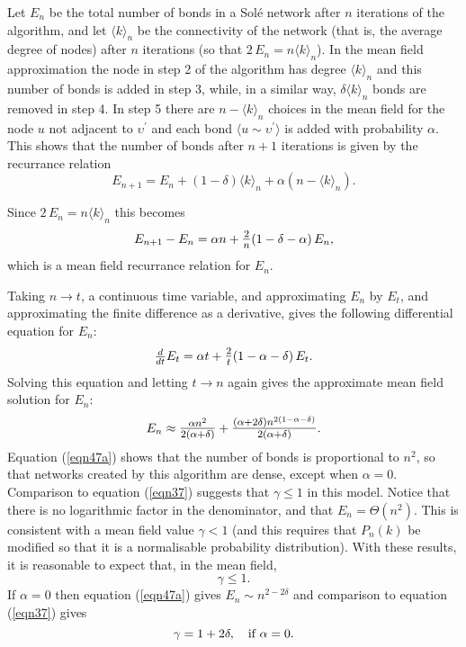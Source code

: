 \documentclass[12pt]{iopart}
\def\edge#1#2{{\langle #1{\sim}#2 \rangle}}
\def\sfrac#1#2{\hbox{\normalsize $\frac{#1}{#2}$}}
\def\Sfrac#1#2{\hbox{\large$\frac{#1}{#2}$}}
\def\Ref#1{(\ref{#1})}
\begin{document}
Let $E_n$ be the total number of bonds in a Sol\'e network after $n$ iterations 
of the algorithm, and let $\langle k \rangle_n$ be the connectivity of the network
(that is, the average degree of nodes) after $n$ iterations (so that 
$2\,E_n = n\langle k \rangle_n$).  In the mean field approximation  the node 
in step 2 of the algorithm has degree $\langle k \rangle_n$ and this number 
of bonds is added in step 3,  while, in a similar way, $\delta \langle k \rangle_n$ 
bonds are removed in step 4.  In step 5 there are $n-\langle k \rangle_n$ choices 
in the mean field for the node $u$ not adjacent to $\upsilon^\prime$ and 
each bond $\edge{u}{\upsilon^\prime}$ is added with probability $\alpha$.  
This shows that the number of bonds after $n+1$ iterations is given by
the recurrance relation
\begin{equation}
E_{n+1} = E_n + (1-\delta) \langle k \rangle_n + \alpha(n - \langle k \rangle_n) .
\end{equation}

Since $2\,E_n = n\langle k \rangle_n$ this becomes
\begin{equation}
E_{n+1} - E_n = \alpha n + \Sfrac{2}{n} (1-\delta-\alpha)\, E_n ,
\end{equation}
which is a mean field recurrance relation for $E_n$.

Taking $n\to t$, a continuous time variable, and approximating $E_n$ by $E_t$,
and approximating the finite difference as a derivative, gives the following
differential equation for $E_n$:
\begin{equation}
\sfrac{d}{dt} E_t = \alpha t + \Sfrac{2}{t}(1-\alpha-\delta)\, E_t .
\end{equation}
Solving this equation and letting $t\to n$ again gives the approximate mean
field solution for $E_n$:
\begin{equation}
E_n \approx \Sfrac{\alpha n^2}{2(\alpha+\delta)} 
+ \Sfrac{(\alpha+2\delta)n^{2(1-\alpha-\delta)}}{2(\alpha+\delta)} .
\label{eqn47a}  %
\end{equation}
Equation \Ref{eqn47a} shows that the number of bonds is proportional to 
$n^2$, so that networks created by this algorithm are dense, except when
$\alpha=0$. Comparison to equation \Ref{eqn37} suggests that $\gamma\leq 1$ in this model.
Notice that there is no logarithmic factor in the denominator, and that
$E_n = \Theta( n^2 )$.  This is consistent with a mean field value $\gamma < 1$
(and this requires that $P_n(k)$ be modified so that it is a normalisable 
probability distribution).  With these results, it is reasonable to expect that,
in the mean field, 
\begin{equation}
\gamma \leq 1.
\label{eqn48a}   %
\end{equation}
If $\alpha=0$ then equation \Ref{eqn47a} gives $E_n \sim n^{2-2\delta}$
and comparison to equation \Ref{eqn37} gives
\begin{equation}
\gamma = 1 + 2\delta, \quad\hbox{if $\alpha = 0$.}
\end{equation}
\end{document}
